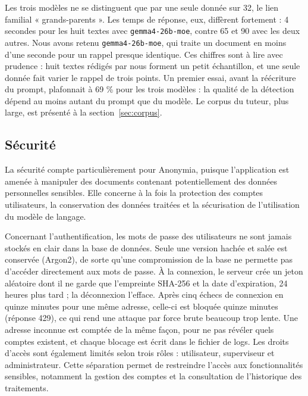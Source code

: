 \documentclass[12pt,a4paper]{article}
\begin{document}
Les trois modèles ne se distinguent que par une seule donnée sur 32, le lien familial « grands-parents ». Les temps de réponse, eux, diffèrent fortement : 4 secondes pour les huit textes avec \texttt{gemma4-26b-moe}, contre 65 et 90 avec les deux autres. Nous avons retenu \texttt{gemma4-26b-moe}, qui traite un document en moins d'une seconde pour un rappel presque identique. Ces chiffres sont à lire avec prudence : huit textes rédigés par nous forment un petit échantillon, et une seule donnée fait varier le rappel de trois points. Un premier essai, avant la réécriture du prompt, plafonnait à 69 \% pour les trois modèles : la qualité de la détection dépend au moins autant du prompt que du modèle. Le corpus du tuteur, plus large, est présenté à la section~\ref{sec:corpus}.

\subsection{Sécurité}

La sécurité compte particulièrement pour Anonymia, puisque l'application est amenée à manipuler des documents contenant potentiellement des données personnelles sensibles. Elle concerne à la fois la protection des comptes utilisateurs, la conservation des données traitées et la sécurisation de
l'utilisation du modèle de langage.

Concernant l'authentification, les mots de passe des utilisateurs ne sont jamais stockés en clair dans la base de données. Seule une version hachée et salée est conservée (Argon2), de sorte qu'une compromission de la base ne permette pas d'accéder directement aux mots de passe. À la connexion, le serveur crée un jeton aléatoire dont il ne garde que l'empreinte SHA-256 et la date d'expiration, 24 heures plus tard ; la déconnexion l'efface. Après cinq échecs de connexion en quinze minutes pour une même adresse, celle-ci est bloquée quinze minutes (réponse 429), ce qui rend une attaque par force brute beaucoup trop lente. Une adresse inconnue est comptée de la même façon, pour ne pas révéler quels comptes existent, et chaque blocage est écrit dans le fichier de logs. Les droits d'accès sont également limités selon trois rôles : utilisateur, superviseur et administrateur. Cette séparation permet de restreindre l'accès aux fonctionnalités sensibles, notamment la gestion des comptes et la consultation de l'historique des traitements.
\end{document}
